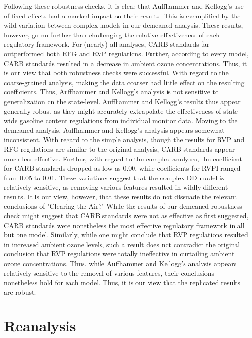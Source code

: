 \documentclass{article}
\begin{document}
Following these robustness checks, it is clear that Auffhammer and Kellogg's use of fixed effects had a marked impact on their results. This is exemplified by the wild variation between complex models in our demeaned analysis. These results, however, go no further than challenging the relative effectiveness of each regulatory framework. For (nearly) all analyses, CARB standards far outperformed both RFG and RVP regulations. Further, according to every model, CARB standards resulted in a decrease in ambient ozone concentrations. Thus, it is our view that both robustness checks were successful. With regard to the coarse-grained analysis, making the data coarser had little effect on the resulting coefficients. Thus, Auffhammer and Kellogg's analysis is not sensitive to generalization on the state-level. Auffhammer and Kellogg's results thus appear generally robust as they might accurately extrapolate the effectiveness of state-wide gasoline content regulations from individual monitor data. Moving to the demeaned analysis, Auffhammer and Kellogg's analysis appears somewhat inconsistent. With regard to the simple analysis, though the results for RVP and RFG regulations are similar to the original analysis, CARB standards appear much less effective. Further, with regard to the complex analyses, the coefficient for CARB standards dropped as low as 0.00, while coefficients for RVPI ranged from 0.05 to 0.01. These variations suggest that the complex DD model is relatively sensitive, as removing various features resulted in wildly different results. It is our view, however, that these results do not dissuade the relevant conclusions of "Clearing the Air?" While the results of our demeaned robustness check might suggest that CARB standards were not as effective as first suggested, CARB standards were nonetheless the most effective regulatory framework in all but one model. Similarly, while one might conclude that RVP regulations resulted in increased ambient ozone levels, such a result does not contradict the original conclusion that RVP regulations were totally ineffective in curtailing ambient ozone concentrations. Thus, while Auffhammer and Kellogg's analysis appears relatively sensitive to the removal of various features, their conclusions nonetheless hold for each model. Thus, it is our view that the replicated results are robust.


\section{Reanalysis}
\end{document}
